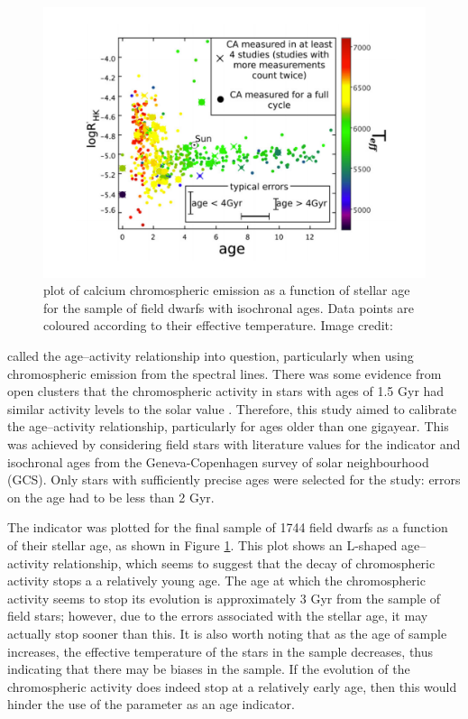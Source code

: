 \begin{figure}
    \centering
    \includegraphics[scale=0.4]{Figures/2-Historical_overview/pace_2013.pdf}
    \caption[\citet{Pace_2013} age--activity relationship]{\citet{Pace_2013} plot of calcium chromospheric emission as a function of stellar age for the sample of field dwarfs with isochronal ages. Data points are coloured according to their effective temperature. Image credit: \citet{Pace_2013}}
    \label{fig:pace_2013_plot}
\end{figure}

\citet{Pace_2013} called the age--activity relationship into question, particularly when using chromospheric emission from the \caII spectral lines. There was some evidence from open clusters that the chromospheric activity in stars with ages of 1.5 Gyr had similar activity levels to the solar value \citep{Pace_Pasquini_2004}. Therefore, this study aimed to calibrate the age--activity relationship, particularly for ages older than one gigayear. This was achieved by considering field stars with literature values for the \Rprime indicator and isochronal ages from the Geneva-Copenhagen survey of solar neighbourhood (GCS). Only stars with sufficiently precise ages were selected for the study: errors on the age had to be less than 2 Gyr.

The \Rprime indicator was plotted for the final sample of 1744 field dwarfs as a function of their stellar age, as shown in Figure \ref{fig:pace_2013_plot}. This plot shows an L-shaped age--activity relationship, which seems to suggest that the decay of chromospheric activity stops a a relatively young age. The age at which the chromospheric activity seems to stop its evolution is approximately 3 Gyr from the sample of field stars; however, due to the errors associated with the stellar age, it may actually stop sooner than this. It is also worth noting that as the age of sample increases, the effective temperature of the stars in the sample decreases, thus indicating that there may be biases in the sample. If the evolution of the chromospheric activity does indeed stop at a relatively early age, then this would hinder the use of the parameter as an age indicator.

